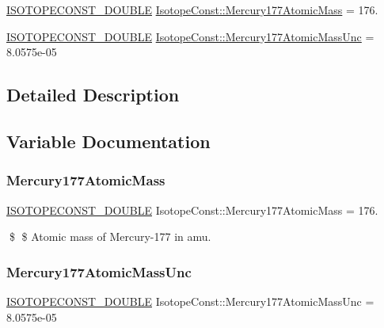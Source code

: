\begin{DoxyCompactItemize}
\item 
\mbox{\hyperlink{group___isotope_const-_macros_ga8f45a7272ce02c0b4c65c44636ed719a}{I\+S\+O\+T\+O\+P\+E\+C\+O\+N\+S\+T\+\_\+\+D\+O\+U\+B\+LE}} \mbox{\hyperlink{group___isotope_const-_mercury-_hg177_ga174a3b15eccd22e287b144d7cef791fe}{Isotope\+Const\+::\+Mercury177\+Atomic\+Mass}} = 176.
\item 
\mbox{\hyperlink{group___isotope_const-_macros_ga8f45a7272ce02c0b4c65c44636ed719a}{I\+S\+O\+T\+O\+P\+E\+C\+O\+N\+S\+T\+\_\+\+D\+O\+U\+B\+LE}} \mbox{\hyperlink{group___isotope_const-_mercury-_hg177_ga14e0a4c52aee46b51f7356aafef144a3}{Isotope\+Const\+::\+Mercury177\+Atomic\+Mass\+Unc}} = 8.\+0575e-\/05
\end{DoxyCompactItemize}


\subsection{Detailed Description}


\subsection{Variable Documentation}
\mbox{\label{group___isotope_const-_mercury-_hg177_ga174a3b15eccd22e287b144d7cef791fe}} 
\subsubsection{\texorpdfstring{Mercury177\+Atomic\+Mass}{Mercury177AtomicMass}}
{\footnotesize\ttfamily \mbox{\hyperlink{group___isotope_const-_macros_ga8f45a7272ce02c0b4c65c44636ed719a}{I\+S\+O\+T\+O\+P\+E\+C\+O\+N\+S\+T\+\_\+\+D\+O\+U\+B\+LE}} Isotope\+Const\+::\+Mercury177\+Atomic\+Mass = 176.}

\$ \$ Atomic mass of Mercury-\/177 in amu. \mbox{\label{group___isotope_const-_mercury-_hg177_ga14e0a4c52aee46b51f7356aafef144a3}} 
\subsubsection{\texorpdfstring{Mercury177\+Atomic\+Mass\+Unc}{Mercury177AtomicMassUnc}}
{\footnotesize\ttfamily \mbox{\hyperlink{group___isotope_const-_macros_ga8f45a7272ce02c0b4c65c44636ed719a}{I\+S\+O\+T\+O\+P\+E\+C\+O\+N\+S\+T\+\_\+\+D\+O\+U\+B\+LE}} Isotope\+Const\+::\+Mercury177\+Atomic\+Mass\+Unc = 8.\+0575e-\/05}

